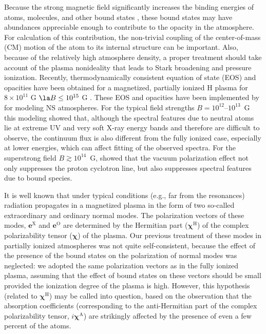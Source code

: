 \documentclass{emulateapj}
\newcommand{\ChiH}{\bm{\chi}^\mathrm{H}}
\newcommand{\ChiA}{\bm{\chi}^\mathrm{A}}
\newcommand{\eX}{\bm{e}^\mathrm{X}}
\newcommand{\eO}{\bm{e}^\mathrm{O}}
\begin{document}
Because the strong magnetic field significantly increases the binding
energies of atoms, molecules, and other bound states \citep[see][
for a review]{Lai01}, these bound states may have abundances
appreciable enough to contribute to the opacity in the atmosphere. For
calculation of this contribution, the non-trivial coupling of the
center-of-mass (CM) motion of the atom to its internal structure 
\citep[e.g.,][ and references therein]{P94} can be important. 
Also, because of the relatively high
atmosphere density, a proper treatment should take account of
 the plasma nonideality
that leads to Stark broadening 
and pressure ionization. Recently,
thermodynamically consistent equation of state (EOS) 
and opacities have been obtained for a magnetized,
partially ionized H plasma for $8\times10^{11}$ G $\la B\leq10^{15}$ G
\citep*{PCS99,PC03,PC04}.
These EOS and opacities have been implemented by
\citet{hoetal03,Ho-COSPAR} for modeling NS atmospheres. For
the typical field strengths $B=10^{12}$--$10^{13}$~G this modeling
showed that, although the spectral features due to neutral atoms lie at
extreme UV and very soft X-ray energy bands and therefore are difficult
to observe, the continuum flux is also different from the fully ionized
case, especially at lower energies, which can affect fitting of the
observed spectra. For the superstrong field $B\gtrsim 10^{14}$~G,
\citet{hoetal03} showed that the vacuum polarization effect not only
suppresses the proton cyclotron line, but also suppresses spectral
features due to bound species.

It is well known \citep[e.g.,][]{Ginzburg,Mesz} that under typical
conditions (e.g., far from the resonances) radiation propagates in a
magnetized plasma in the form of two so-called extraordinary and
ordinary normal modes. The polarization vectors of these modes,
$\eX$ and $\eO$ are determined by the
Hermitian part ($\ChiH$) of the complex polarizability
tensor ($\bm{\chi}$) of the plasma. Our previous treatment of these modes
in partially ionized atmospheres \citep{PC03,PC04,hoetal03,Ho-COSPAR}
was not quite self-consistent, because the effect of the presence of
the bound states on the polarization of normal modes was neglected: we
adopted the same polarization vectors as in the fully ionized plasma,
assuming \citep{PC03} that the effect of bound states on these vectors
should be small provided the ionization degree of the plasma is high.
However, this hypothesis (related to $\ChiH$) may be
called into question, based on the observation that the absorption
coefficients (corresponding to the {anti-Hermitian} part of the
complex polarizability tensor, $i\ChiA$) are strikingly affected
by the presence of even a few percent of the atoms.
\end{document}
